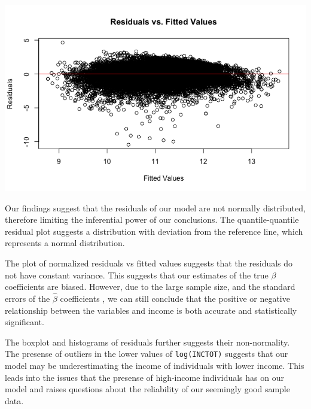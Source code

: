 \documentclass{article}
\newenvironment{custommargins}[2]{%
    \newgeometry{left=#1, right=#2}%
}{%
    \restoregeometry%
}
\begin{document}
\begin{custommargins}{2cm}{2cm}
\begin{minipage}{0.49\textwidth}
\end{minipage}
\begin{minipage}{0.49\textwidth}
    \centering
    \includegraphics[width=\textwidth]{../figures/post/residualvsfitted-k-foldcv.png}
\end{minipage}
\vfill
\end{custommargins}
Our findings suggest that the residuals of our model are not normally distributed, therefore limiting the inferential power of our conclusions.
The quantile-quantile residual plot suggests a distribution with deviation from the reference line, which represents a normal distribution.

The plot of normalized residuals vs fitted values suggests that the residuals do not have constant variance.
This suggests that our estimates of the true $\beta$ coefficients are biased. However, due to the large sample size, and the standard errors of the $\hat{\beta}$ coefficients
, we can still conclude that the positive or negative relationship between the variables and income is both accurate and statistically significant.

The boxplot and histograms of residuals further suggests their non-normality. The presense of outliers in the lower values of \texttt{log(INCTOT)} suggests that our model may be underestimating the income of individuals with lower income.
This leads into the issues that the presense of high-income individuals has on our model and raises questions about the reliability of our seemingly good sample data.

\end{document}
